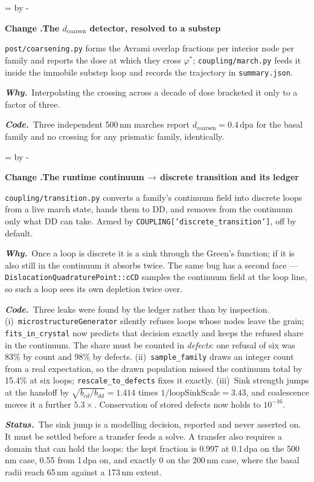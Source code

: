 \documentclass[11pt,a4paper]{article}
\newcommand{\code}[1]{\texttt{\small #1}}
\newcommand{\needlines}[1]{%
  \par\dimen0=\pagegoal \advance\dimen0 by -\pagetotal
  \ifdim\dimen0<#1\baselineskip \newpage \fi}
\newcounter{chg}
\newcommand{\change}[1]{%
  \needlines{4}%
  \refstepcounter{chg}%
  \par\medskip\noindent
  {\bfseries\boldmath Change \thechg.\quad #1}%
  \par\nobreak\smallskip}
\newcommand{\why}[1]{\par\noindent\textbf{\itshape Why.}\ #1\par}
\newcommand{\impact}[1]{\par\noindent\textbf{\itshape Code.}\ #1\par}
\newcommand{\status}[1]{\par\noindent\textbf{\itshape Status.}\ #1\par}
\begin{document}
\change{The $d_{\text{coarsen}}$ detector, resolved to a substep}
\label{chg:dcoarsen}
\code{post/coarsening.py} forms the Avrami overlap fractions per interior node
per family and reports the dose at which they cross $\varphi^\ast$;
\code{coupling/march.py} feeds it inside the immobile substep loop and records
the trajectory in \code{summary.json}.
\why{Interpolating the crossing across a decade of dose bracketed it only to a
factor of three.}
\impact{Three independent 500\,nm marches report $d_{\text{coarsen}}=0.4$\,dpa
for the basal family and no crossing for any prismatic family, identically.}

\change{The runtime continuum\,$\rightarrow$\,discrete transition and its ledger}
\label{chg:transition}
\code{coupling/transition.py} converts a family's continuum field into discrete
loops from a live march state, hands them to DD, and removes from the continuum
only what DD can take. Armed by \code{COUPLING['discrete\_transition']}, off by
default.
\why{Once a loop is discrete it is a sink through the Green's function; if it
is also still in the continuum it absorbs twice. The same bug has a second
face --- \code{DislocationQuadraturePoint::cCD} samples the continuum field at
the loop line, so such a loop sees its own depletion twice over.}
\impact{Three leaks were found by the ledger rather than by inspection.
(i)~\code{microstructureGenerator} silently refuses loops whose nodes leave the
grain; \code{fits\_in\_crystal} now predicts that decision exactly and keeps
the refused share in the continuum. The share must be counted in
\emph{defects}: one refusal of six was 83\% by count and 98\% by defects.
(ii)~\code{sample\_family} draws an integer count from a real expectation, so
the drawn population missed the continuum total by 15.4\% at six loops;
\code{rescale\_to\_defects} fixes it exactly. (iii)~Sink strength jumps at the
handoff by $\sqrt{b_{cd}/b_{dd}}=1.414$ times $1/\text{loopSinkScale}=3.43$,
and coalescence moves it a further $5.3\times$. Conservation of stored defects
now holds to $10^{-16}$.}
\status{The sink jump is a modelling decision, reported and never asserted on.
It must be settled before a transfer feeds a solve. A transfer also requires a
domain that can hold the loops: the kept fraction is 0.997 at 0.1\,dpa on the
500\,nm case, 0.55 from 1\,dpa on, and exactly 0 on the 200\,nm case, where the
basal radii reach 65\,nm against a 173\,nm extent.}
\end{document}
